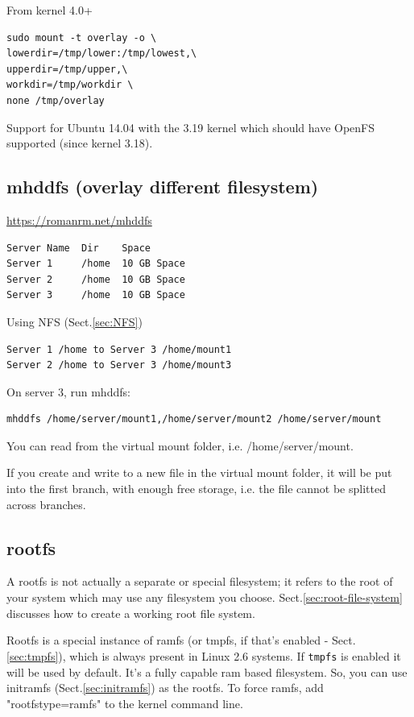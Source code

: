 From kernel 4.0+
\begin{verbatim}
sudo mount -t overlay -o \
lowerdir=/tmp/lower:/tmp/lowest,\
upperdir=/tmp/upper,\
workdir=/tmp/workdir \
none /tmp/overlay
\end{verbatim}

Support for  Ubuntu 14.04 with the 3.19 kernel which should have OpenFS
supported (since kernel 3.18).


\subsection{mhddfs (overlay different filesystem)}
\label{sec:mhddfs}


\url{https://romanrm.net/mhddfs}

\begin{verbatim}
Server Name  Dir    Space
Server 1     /home  10 GB Space
Server 2     /home  10 GB Space
Server 3     /home  10 GB Space
\end{verbatim}
Using NFS (Sect.\ref{sec:NFS})
\begin{verbatim}
Server 1 /home to Server 3 /home/mount1
Server 2 /home to Server 3 /home/mount3
\end{verbatim}
On server 3, run mhddfs:
\begin{verbatim}
mhddfs /home/server/mount1,/home/server/mount2 /home/server/mount
\end{verbatim}

You can read from the virtual mount folder, i.e. /home/server/mount.

If you create and write to a new file in the virtual mount folder, it will be
put into the first branch, with enough free storage, i.e. the file cannot be
splitted across branches.

\subsection{rootfs}
\label{sec:rootfs}

A rootfs is not actually a separate or special filesystem; it refers to the root
of your system which may use any filesystem you choose.
Sect.\ref{sec:root-file-system} discusses how to create a working root file
system.


Rootfs is a special instance of ramfs (or tmpfs, if that's enabled -
Sect.\ref{sec:tmpfs}), which is always present in Linux 2.6 systems.
If \verb!tmpfs! is enabled it will be used by default. 
It's a fully capable ram based filesystem. So, you can use initramfs
(Sect.\ref{sec:initramfs}) as the rootfs. To force ramfs, add
"rootfstype=ramfs" to the kernel command line.


